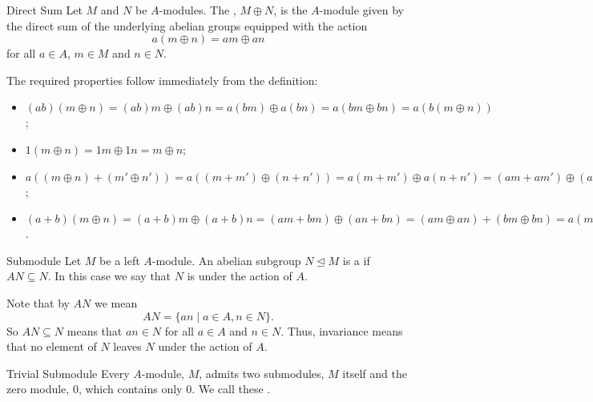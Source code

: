 \documentclass[fleqn]{NotesClass}
\begin{document}
    \begin{dfn}{Direct Sum}{}
        Let \(M\) and \(N\) be \(A\)-modules.
        The , \(M \oplus N\), is the \(A\)-module given by the direct sum of the underlying abelian groups equipped with the action
        \begin{equation}
            a(m \oplus n) = am \oplus an
        \end{equation}
        for all \(a \in A\), \(m \in M\) and \(n \in N\).
    \end{dfn}
    
    The required properties follow immediately from the definition:
    \begin{itemize}
        \item[M1] \((ab)(m \oplus n) = (ab)m \oplus (ab)n = a(bm) \oplus a(bn) = a(bm \oplus bn) = a(b(m \oplus n))\);
        \item[M2] \(1(m \oplus n) = 1m \oplus 1n = m \oplus n\);
        \item[M3] \(a((m \oplus n) + (m' \oplus n')) = a((m + m') \oplus (n + n')) = a(m + m') \oplus a(n + n') = (am + am') \oplus (an + an') = (am \oplus an) + (am' \oplus an') = a(m \oplus n) + a(m' \oplus n')\);
        \item[M4] \((a + b)(m \oplus n) = (a + b)m \oplus (a + b)n = (am + bm) \oplus (an + bn) = (am \oplus an) + (bm \oplus bn) = a(m \oplus n) + b(m \oplus n)\).
    \end{itemize}
    
    \begin{dfn}{Submodule}{}
        Let \(M\) be a left \(A\)-module.
        An abelian subgroup \(N \trianglelefteq M\) is a  if \(AN \subseteq N\).
        In this case we say that \(N\) is  under the action of \(A\).
    \end{dfn}
    
    Note that by \(AN\) we mean
    \begin{equation}
        AN = \{an \mid a \in A , n \in N\}.
    \end{equation}
    So \(AN \subseteq N\) means that \(an \in N\) for all \(a \in A\) and \(n \in N\).
    Thus, invariance means that no element of \(N\) leaves \(N\) under the action of \(A\).
    
    \begin{dfn}{Trivial Submodule}{}
        Every \(A\)-module, \(M\), admits two submodules, \(M\) itself and the zero module, \(0\), which contains only \(0\).
        We call these .
    \end{dfn}
    
\end{document}
